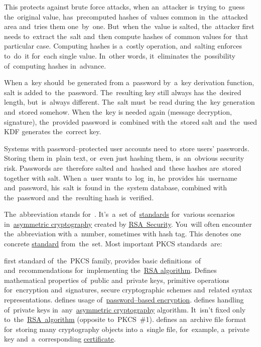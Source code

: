 This protects against brute force attacks, when an~attacker is~trying to~guess the~original value, has~precomputed hashes of~values common in~the~attacked area and~tries them one~by~one.
But~when the~value is salted, the~attacker first needs to~extract the~salt and~then compute hashes of~common values for~that particular case.
Computing hashes is a~costly operation, and~salting enforces to~do~it for~each single value.
In~other words, it~eliminates the~possibility of~computing hashes in~advance.

When a~key should~be generated from a~password by~a~key derivation function, salt is added to~the~password.
The~resulting key still always has the~desired length, but~is~always different.
The~salt must~be read during the~key generation and~stored somehow.
When the~key is needed again (message decryption, signature), the~provided password is~combined with the~stored salt and~the~used KDF generates the~correct key.

Systems with password--protected user accounts need to~store users' passwords.
Storing them in~plain text, or~even just hashing them, is~an~obvious security risk.
Passwords are~therefore salted and~hashed and~these hashes are~stored together with salt.
When a~user wants to~log~in, he~provides his~username and~password, his~salt is~found in~the~system database, combined with the~password and~the~resulting hash is~verified.

The~abbreviation stands for~.
It's~a~set of~\hyperref[protocolstandard]{standards} for~various scenarios in~\hyperref[asymmetriccryptography]{asymmetric cryptography} created by \href{https://en.wikipedia.org/wiki/RSA_Security}{RSA~Security}.
You~will often encounter the~abbreviation with a~number, sometimes with hash tag.
This denotes one concrete \hyperref[protocolstandard]{standard} from~the~set.
Most important PKCS standards~are:
\begin{itemize}
     first standard of~the~PKCS family, provides basic definitions~of and~recommendations for~implementing the~\hyperref[rsa]{RSA algorithm}.
             Defines mathematical properties of~public and~private keys, primitive operations for~encryption and~signatures, secure cryptographic schemes and~related syntax representations.
     defines usage of~\hyperref[keypassword]{password--based encryption}.
     defines handling of~private keys in~any~\hyperref[asymmetriccryptography]{asymmetric cryptography} algorithm.
             It~isn't fixed only to~the~\hyperref[rsa]{RSA~algorithm} (opposite to~PKCS~\#1).
     defines an~archive file format for~storing many cryptography objects into a~single file, for~example, a~private key and~a~corresponding \hyperref[certificate]{certificate}.
\end{itemize}
